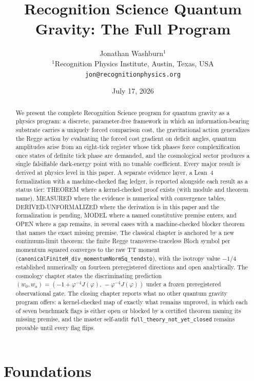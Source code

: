 \documentclass[11pt,letterpaper]{article}
\title{Recognition Science Quantum Gravity: The Full Program}
\author{Jonathan Washburn$^{1}$\\[4pt]
\small $^{1}$Recognition Physics Institute, Austin, Texas, USA\\
\small \texttt{jon@recognitionphysics.org}}
\date{July 17, 2026}
\newcommand{\lean}[1]{\texttt{#1}}
\begin{document}
\maketitle

\begin{abstract}
We present the complete Recognition Science program for quantum gravity as a physics program: a discrete, parameter-free framework in which an information-bearing substrate carries a uniquely forced comparison cost, the gravitational action generalizes the Regge action by evaluating the forced cost gradient on deficit angles, quantum amplitudes arise from an eight-tick register whose tick phases force complexification once states of definite tick phase are demanded, and the cosmological sector produces a single falsifiable dark-energy point with no tunable coefficient. Every major result is derived at physics level in this paper. A separate evidence layer, a Lean~4 formalization with a machine-checked flag ledger, is reported alongside each result as a status tier: THEOREM where a kernel-checked proof exists (with module and theorem name), MEASURED where the evidence is numerical with convergence tables, DERIVED-UNFORMALIZED where the derivation is in this paper and the formalization is pending, MODEL where a named constitutive premise enters, and OPEN where a gap remains, in several cases with a machine-checked blocker theorem that names the exact missing premise. The classical chapter is anchored by a new continuum-limit theorem: the finite Regge transverse-traceless Bloch symbol per momentum squared converges to the raw TT moment (\lean{canonicalFiniteH\_div\_momentumNormSq\_tendsto}), with the isotropy value $-1/4$ established numerically on fourteen preregistered directions and open analytically. The cosmology chapter states the discriminating prediction $(w_0,w_a)=(-1+\varphi^{-4}J(\varphi),\,-\varphi^{-4}J(\varphi))$ under a frozen preregistered observational gate. The closing chapter reports what no other quantum gravity program offers: a kernel-checked map of exactly what remains unproved, in which each of seven benchmark flags is either open or blocked by a certified theorem naming its missing premise, and the master self-audit \lean{full\_theory\_not\_yet\_closed} remains provable until every flag flips.
\end{abstract}

\tableofcontents
\newpage

\part{Foundations}
\end{document}
